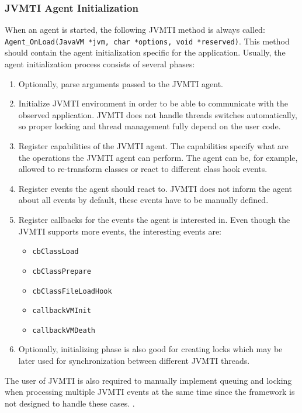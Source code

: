 \subsubsection{JVMTI Agent Initialization}
\label{subsec:jvmti_init}
When an agent is started, the following JVMTI method is always called: \linebreak \texttt{Agent\_OnLoad(JavaVM *jvm, char *options, void *reserved)}. This method should contain the agent initialization specific for the application. Usually, the agent initialization process consists of several phases:
\begin{enumerate}
	\item Optionally, parse arguments passed to the JVMTI agent.
	\item Initialize JVMTI environment in order to be able to communicate with the observed application. JVMTI does not handle threads switches automatically, so proper locking and thread management fully depend on the user code.
	\item Register capabilities of the JVMTI agent. The capabilities specify what are the operations the JVMTI agent can perform. The agent can be, for example, allowed to re-transform classes or react to different class hook events.
	\item Register events the agent should react to. JVMTI does not inform the agent about all events by default, these events have to be manually defined.
	\item Register callbacks for the events the agent is interested in. Even though the JVMTI supports more events, the interesting events are: 
		\begin{itemize}
			\item \texttt{cbClassLoad}
			\item \texttt{cbClassPrepare}
			\item \texttt{cbClassFileLoadHook}
			\item \texttt{callbackVMInit}
			\item \texttt{callbackVMDeath}
		\end{itemize}
	\item Optionally, initializing phase is also good for creating locks which may be later used for synchronization between different JVMTI threads.
\end{enumerate}

The user of JVMTI is also required to manually implement queuing and locking when processing multiple JVMTI events at the same time since the framework is not designed to handle these cases. \cite{JVMTI_Callbacks}.
